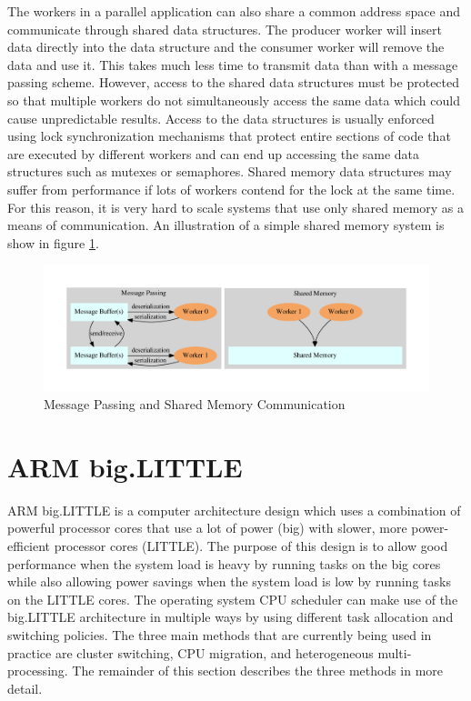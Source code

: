 \documentclass[11pt]{book}
\begin{document}
The workers in a parallel application can also share a common address space and communicate
through shared data structures. The producer worker will insert data directly into the data
structure and the consumer worker will remove the data and use it. This takes much less time
to transmit data than with a message passing scheme. However, access to the shared data
structures must be protected so that multiple workers do not simultaneously access the same
data which could cause unpredictable results. Access to the data structures is usually enforced
using lock synchronization mechanisms that protect entire sections of code that are executed by
different workers and can end up accessing the same data structures such as mutexes or semaphores.
Shared memory data structures may suffer from performance if lots of workers contend for the
lock at the same time. For this reason, it is very hard to scale systems that use only shared
memory as a means of communication. An illustration of a simple shared memory system is show
in figure \ref{communication}.

\begin{figure}[H]
    \centering
    \includegraphics[width=\textwidth]{figs/graphviz/parallel_communication.pdf}
    \caption{Message Passing and Shared Memory Communication}\label{communication}
\end{figure}

\section{ARM big.LITTLE}

ARM big.LITTLE is a computer architecture design which uses a combination of powerful
processor cores that use a lot of power (big) with slower, more power-efficient processor
cores (LITTLE). The purpose of this design is to allow good performance when the system load
is heavy by running tasks on the big cores while also allowing power savings when the system
load is low by running tasks on the LITTLE cores. The operating system CPU scheduler can
make use of the big.LITTLE architecture in multiple ways by using different task allocation
and switching policies. The three main methods that are currently being used in practice
are cluster switching, CPU migration, and heterogeneous multi-processing. The remainder of
this section describes the three methods in more detail.
\end{document}

